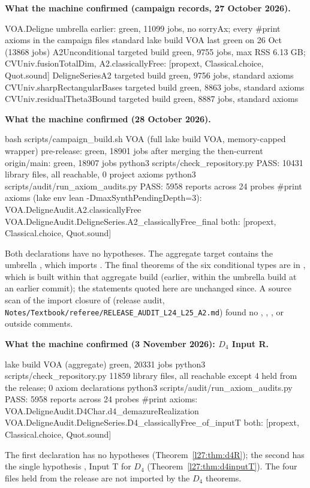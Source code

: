 \textbf{What the machine confirmed (campaign records, 27 October 2026).}
\begin{plaincode}
VOA.Deligne umbrella      earlier: green, 11099 jobs, no sorryAx;
                          every #print axioms in the campaign files standard
lake build VOA            last green on 26 Oct (13868 jobs)
A2Unconditional           targeted build green, 9755 jobs, max RSS 6.13 GB;
                          CVUniv.fusionTotalDim, A2.classicallyFree:
                          [propext, Classical.choice, Quot.sound]
DeligneSeriesA2           targeted build green, 9756 jobs, standard axioms
CVUniv.sharpRectangularBases  targeted build green, 8863 jobs, standard axioms
CVUniv.residualTheta3Bound    targeted build green, 8887 jobs, standard axioms
\end{plaincode}
\textbf{What the machine confirmed (28 October 2026).}
\begin{plaincode}
bash scripts/campaign_build.sh VOA    (full lake build VOA, memory-capped wrapper)
  pre-release: green, 18901 jobs
  after merging the then-current origin/main: green, 18907 jobs
python3 scripts/check_repository.py         PASS: 10431 library files, all reachable,
                                            0 project axioms
python3 scripts/audit/run_axiom_audits.py   PASS: 5958 reports across 24 probes
#print axioms (lake env lean -DmaxSynthPendingDepth=3):
  VOA.DeligneAudit.A2.classicallyFree
  VOA.DeligneAudit.DeligneSeries.A2_classicallyFree_final
    both: [propext, Classical.choice, Quot.sound]
\end{plaincode}
Both declarations have no hypotheses. The aggregate target contains the umbrella , which imports
. The final theorems of the six conditional types are in
, which is built within that aggregate build (earlier, within the umbrella build at
an earlier commit); the statements quoted here are unchanged since. A source scan of the import closure of  (release audit,
\texttt{Notes/Textbook/referee/RELEASE\_AUDIT\_L24\_L25\_A2.md}) found no , , ,  or
 outside comments.

\textbf{What the machine confirmed (3 November 2026): $D_4$ Input R.}
\begin{plaincode}
lake build VOA (aggregate)                  green, 20331 jobs
python3 scripts/check_repository.py         11859 library files, all reachable
                                            except 4 held from the release;
                                            0 axiom declarations
python3 scripts/audit/run_axiom_audits.py   PASS: 5958 reports across 24 probes
#print axioms:
  VOA.DeligneAudit.D4Char.d4_demazureRealization
  VOA.DeligneAudit.DeligneSeries.D4_classicallyFree_of_inputT
    both: [propext, Classical.choice, Quot.sound]
\end{plaincode}
The first declaration has no hypotheses (Theorem~\ref{l27:thm:d4R}); the second has the single hypothesis , Input T for
$D_4$ (Theorem~\ref{l27:thm:d4inputT}). The four files held from the release are not imported by the $D_4$ theorems.

